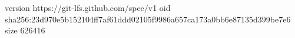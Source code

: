 version https://git-lfs.github.com/spec/v1
oid sha256:23d970e5b152104ff7af61ddd02105f9986a657ca173a0bb6e87135d399be7e6
size 626416

